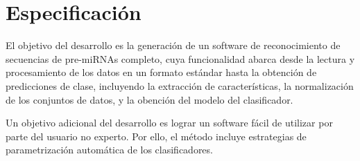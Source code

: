 %
%
%
%
\chapter{Especificación}
%
El objetivo del desarrollo es la generación de un software de
reconocimiento de secuencias de pre-miRNAs completo, cuya
funcionalidad abarca desde la lectura y procesamiento de los datos en
un formato estándar hasta la obtención de predicciones de clase,
incluyendo la extracción de características, la normalización de los
conjuntos de datos, y la obención del modelo del clasificador.

Un objetivo adicional del desarrollo es lograr un software fácil de
utilizar por parte del usuario no experto. Por ello, el método incluye
estrategias de parametrización automática de los clasificadores.
